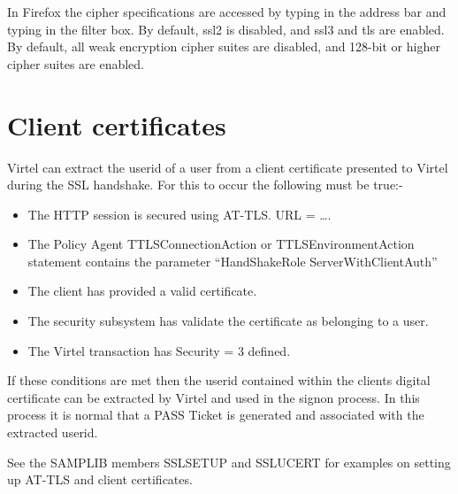 \documentclass[letterpaper,10pt,english]{sphinxmanual}
\begin{document}
In Firefox the cipher specifications are accessed by typing  in the address bar and typing  in the filter box. By default, ssl2 is disabled, and ssl3 and tls are enabled. By default, all weak encryption cipher suites are disabled, and 128-bit or higher cipher suites are enabled.

\ignorespaces 

\section{Client certificates}
\label{\detokenize{connectivity_guide:client-certificates}}\label{\detokenize{connectivity_guide:index-161}}
Virtel can extract the userid of a user from a client certificate presented to Virtel during the SSL handshake. For this to occur the following must be true:-
\begin{itemize}
\item {} 
The HTTP session is secured using AT-TLS. URL = ….

\item {} 
The Policy Agent TTLSConnectionAction or TTLSEnvironmentAction statement contains the parameter “HandShakeRole ServerWithClientAuth”

\item {} 
The client has provided a valid certificate.

\item {} 
The security subsystem has validate the certificate as belonging to a user.

\item {} 
The Virtel transaction has Security = 3 defined.

\end{itemize}

If these conditions are met then the userid contained within the clients digital certificate can be extracted by Virtel and used in the signon process. In this process it is normal that a PASS Ticket is generated and associated with the extracted userid.

See the SAMPLIB members SSLSETUP and SSLUCERT for examples on setting up AT-TLS and client certificates.

\newpage

\ignorespaces 
\end{document}
